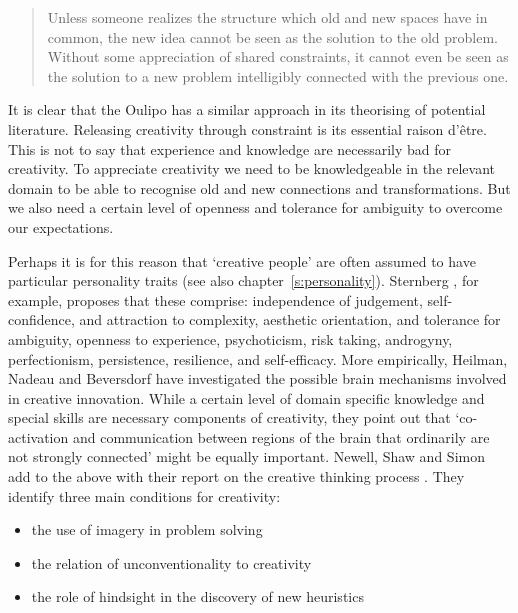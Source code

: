 \begin{quotation}
  Unless someone realizes the structure which old and new spaces have in common, the new idea cannot be seen as the solution to the old problem. Without some appreciation of shared constraints, it cannot even be seen as the solution to a new problem intelligibly connected with the previous one. 
\end{quotation}

It is clear that the Oulipo has a similar approach in its theorising of potential literature. Releasing creativity through constraint is its essential raison d'être. This is not to say that experience and knowledge are necessarily bad for creativity. To appreciate creativity we need to be knowledgeable in the relevant domain to be able to recognise old and new connections and transformations. But we also need a certain level of openness and tolerance for ambiguity to overcome our expectations.

Perhaps it is for this reason that `creative people' are often assumed to have particular personality traits (see also chapter~\ref{s:personality}). Sternberg \citeyear{Sternberg1999}, for example, proposes that these comprise: independence of judgement, self-confidence, and attraction to complexity, aesthetic orientation, and tolerance for ambiguity, openness to experience, psychoticism, risk taking, androgyny, perfectionism, persistence, resilience, and self-efficacy. More empirically, Heilman, Nadeau and Beversdorf \citeyear{Heilman2003} have investigated the possible brain mechanisms involved in creative innovation. While a certain level of domain specific knowledge and special skills are necessary components of creativity, they point out that `co-activation and communication between regions of the brain that ordinarily are not strongly connected' might be equally important. Newell, Shaw and Simon add to the above with their report on the creative thinking process \citeyear{Newell1963}. They identify three main conditions for creativity:

\begin{itemize}
  \item the use of imagery in problem solving
  \item the relation of unconventionality to creativity
  \item the role of hindsight in the discovery of new heuristics
\end{itemize}

